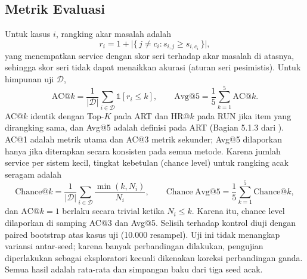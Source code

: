 \subsection{Metrik Evaluasi}\label{sec:metrics}
Untuk kasus $i$, rangking akar masalah adalah
\begin{equation}
r_i = 1 + \bigl|\{\,j\neq c_i : s_{i,j}\ge s_{i,c_i}\,\}\bigr|,
\end{equation}
yang menempatkan service dengan skor seri terhadap akar masalah di atasnya, sehingga skor seri tidak dapat menaikkan akurasi (aturan seri pesimistis).  Untuk himpunan uji $\mathcal{D}$,
\begin{equation}
\mathrm{AC@}k=\frac{1}{|\mathcal{D}|}\sum_{i\in\mathcal{D}}\mathbb{1}[r_i\le k],\qquad
\mathrm{Avg@}5=\frac{1}{5}\sum_{k=1}^{5}\mathrm{AC@}k .
\end{equation}
AC@$k$ identik dengan Top-$K$ pada ART dan HR@$k$ pada RUN jika item yang dirangking sama, dan Avg@5 adalah definisi pada ART (Bagian 5.1.3 dari \cite{sun2024art}). AC@1 adalah metrik utama dan AC@3 metrik sekunder; Avg@5 dilaporkan hanya jika diterapkan secara konsisten pada semua metode. Karena jumlah service per sistem kecil, tingkat kebetulan (chance level) untuk rangking acak seragam adalah
\begin{equation}
\mathrm{Chance@}k=\frac{1}{|\mathcal{D}|}\sum_{i\in\mathcal{D}}\frac{\min(k,N_i)}{N_i},\qquad
\mathrm{Chance\ Avg@}5=\frac{1}{5}\sum_{k=1}^{5}\mathrm{Chance@}k ,
\end{equation}
dan $\mathrm{AC@}k=1$ berlaku secara trivial ketika $N_i\le k$. Karena itu, chance level dilaporkan di samping AC@3 dan Avg@5. Selisih terhadap kontrol diuji dengan paired bootstrap atas kasus uji (10.000 resampel). Uji ini tidak menangkap variansi antar-seed; karena banyak perbandingan dilakukan, pengujian diperlakukan sebagai eksploratori kecuali dikenakan koreksi perbandingan ganda. Semua hasil adalah rata-rata dan simpangan baku dari tiga seed acak.
